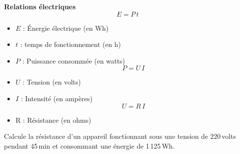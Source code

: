 \begin{exercice}

\begin{cadre}
\textbf{Relations électriques}
\[ E = P\,t \]
\begin{itemize}
\item $E$ : Énergie électrique (en Wh)
\item $t$ : temps de fonctionnement (en h)
\item $P$ : Puissance consommée (en watts)
\[P = U\,I\]
\item $U$ : Tension (en volts)
\item $I$ : Intensité (en ampères)
\[U = R\,I\]
\item R : Résistance (en ohms)
\end{itemize}
\end{cadre}

Calcule la résistance d'un appareil fonctionnant sous une tension de 220\,volts pendant 45\,min et consommant une énergie de 1\,125\,Wh.
\end{exercice}




